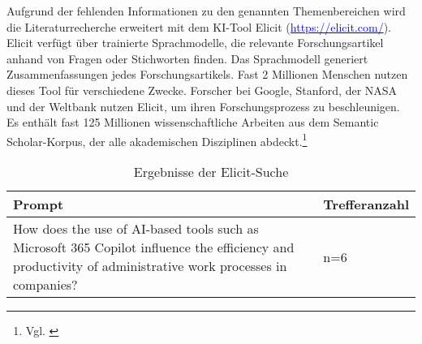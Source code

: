 Aufgrund der fehlenden Informationen zu den genannten Themenbereichen wird die Literaturrecherche erweitert mit dem KI-Tool Elicit (\underline{\textcolor{blue}{https://elicit.com/}}). Elicit  verfügt über trainierte Sprachmodelle, die relevante Forschungsartikel anhand von Fragen oder Stichworten finden. Das Sprachmodell generiert Zusammenfassungen jedes Forschungsartikels. Fast 2 Millionen Menschen nutzen dieses Tool für verschiedene Zwecke. Forscher bei Google, Stanford, der NASA und der Weltbank nutzen Elicit, um ihren Forschungsprozess zu beschleunigen. Es enthält fast 125 Millionen wissenschaftliche Arbeiten aus dem Semantic Scholar-Korpus, der alle akademischen Disziplinen abdeckt.\footnote{Vgl. \cite{EduTools2024}}

\begin{longtable}{|p{9cm}|p{3cm}|}
    \caption{Ergebnisse der Elicit-Suche} \label{tab:elicitergebnisse} \\
    \hline
    \textbf{Prompt} & \textbf{Trefferanzahl} \\
    \hline
    How does the use of AI-based tools such as Microsoft 365 Copilot influence the efficiency and productivity of administrative work processes in companies? & n=6 \\
    \hline
\end{longtable}

\clearpage